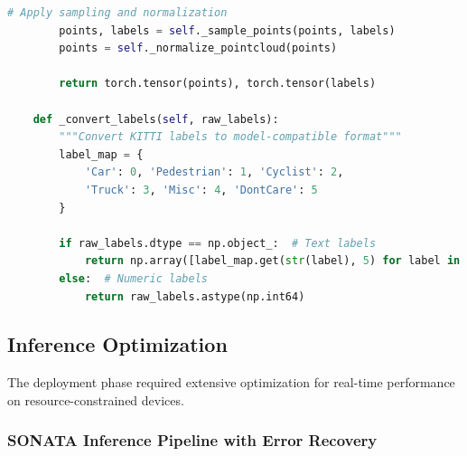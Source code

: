 \documentclass[12pt,a4paper]{report}
\begin{document}
\begin{lstlisting}[caption=Comprehensive Dataset Processing Pipeline, label=lst:dataset_processing, language=python]
        # Apply sampling and normalization
        points, labels = self._sample_points(points, labels)
        points = self._normalize_pointcloud(points)
        
        return torch.tensor(points), torch.tensor(labels)
    
    def _convert_labels(self, raw_labels):
        """Convert KITTI labels to model-compatible format"""
        label_map = {
            'Car': 0, 'Pedestrian': 1, 'Cyclist': 2,
            'Truck': 3, 'Misc': 4, 'DontCare': 5
        }
        
        if raw_labels.dtype == np.object_:  # Text labels
            return np.array([label_map.get(str(label), 5) for label in raw_labels])
        else:  # Numeric labels
            return raw_labels.astype(np.int64)
\end{lstlisting}

\subsection{Inference Optimization}

The deployment phase required extensive optimization for real-time performance on resource-constrained devices.

\subsubsection{SONATA Inference Pipeline with Error Recovery}
\end{document}
